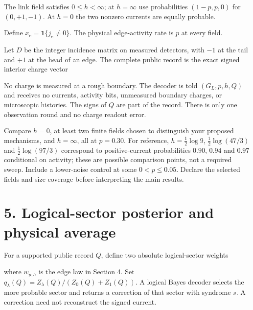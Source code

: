 \documentclass[11pt,letterpaper]{article}
\newcommand{\displayfit}[1]{\sbox{\mathbox}{$\displaystyle #1$}\ifdim\wd\mathbox>\linewidth\resizebox{\linewidth}{!}{\usebox{\mathbox}}\else\usebox{\mathbox}\fi}
\begin{document}
The link field satisfies $0\leq h<\infty$; at $h=\infty$ use probabilities $(1-p,p,0)$ for $(0,+1,-1)$. At $h=0$ the two nonzero currents are equally probable.\par

Define $x_e=\mathbf1\{j_e\ne0\}$. The physical edge-activity rate is $p$ at every field.\par

Let $D$ be the integer incidence matrix on measured detectors, with $-1$ at the tail and $+1$ at the head of an edge. The complete public record is the exact signed interior charge vector\par

\begin{center}\displayfit{Q=Dj,\qquad s=Q\bmod2=Hx.}\end{center}

No charge is measured at a rough boundary. The decoder is told $(G_L,p,h,Q)$ and receives no currents, activity bits, unmeasured boundary charges, or microscopic histories. The signs of $Q$ are part of the record. There is only one observation round and no charge readout error.\par

Compare $h=0$, at least two finite fields chosen to distinguish your proposed mechanisms, and $h=\infty$, all at $p=0.30$. For reference, $h=\tfrac12\log9$, $\tfrac12\log(47/3)$ and $\tfrac12\log(97/3)$ correspond to positive-current probabilities $0.90$, $0.94$ and $0.97$ conditional on activity; these are possible comparison points, not a required sweep. Include a lower-noise control at some $0<p\leq0.05$. Declare the selected fields and size coverage before interpreting the main results.\par

\section*{5. Logical-sector posterior and physical average}


For a supported public record $Q$, define two absolute logical-sector weights\par

\begin{center}\displayfit{Z_\lambda(Q)=\sum_{j:Dj=Q,\ \ell(\mathbf1\{j\ne0\})=\lambda}\prod_e w_{p,h}(j_e),\qquad \lambda\in\{0,1\},}\end{center}

where $w_{p,h}$ is the edge law in Section 4. Set $q_\lambda(Q)=Z_\lambda(Q)/(Z_0(Q)+Z_1(Q))$. A logical Bayes decoder selects the more probable sector and returns a correction of that sector with syndrome $s$. A correction need not reconstruct the signed current.\par
\end{document}
